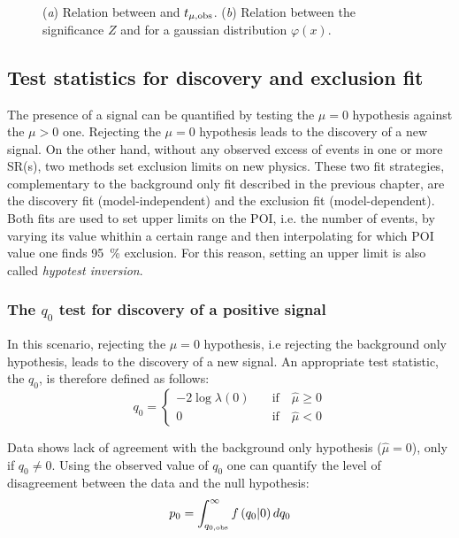 \begin{figure}[tp]
\centering
{}
\caption{(\emph{a}) Relation between \p and $t_{\mu,\textup{obs}}$. (\emph{b}) Relation between the significance $Z$ and \p for a gaussian distribution $\varphi(x)$.}
\label{pvalue}
\end{figure}

\subsection{Test statistics for discovery and exclusion fit}
The presence of a signal can be quantified by testing the $\mu=0$ hypothesis against the $\mu>0$ one. Rejecting the $\mu=0$ hypothesis leads to the discovery of a new signal. On the other hand, without any observed excess of events in one or more SR(s), two methods set exclusion limits on new physics. These two fit strategies, complementary to the background only fit described in the previous chapter, are the discovery fit (model-independent) and the exclusion fit (model-dependent). Both fits are used to set upper limits on the POI, i.e. the number of events, by varying its value whithin a certain range and then interpolating for which POI value one finds \SI{95}{\percent} exclusion. For this reason, setting an upper limit is also called \emph{hypotest inversion}.

\subsubsection{The $q_0$ test for discovery of a positive signal}
In this scenario, rejecting the $\mu = 0$ hypothesis, i.e rejecting the background only hypothesis, leads to the discovery of a new signal.  An appropriate test statistic, the $q_0$, is therefore defined as follows:
\begin{equation}
q_0=
\left\{
\begin{aligned}
-2\log{\lambda(0)}\quad &\text{if}\quad \hat{\mu}\ge0\\
 0 \qquad&\text{if}\quad \hat{\mu}<0
\end{aligned}
\right.
\end{equation} 

Data shows lack of agreement with the background only hypothesis ($\hat{\mu}=0$), only if $q_0\ne0$. Using the observed value of $q_0$ one can quantify the level of disagreement between the data and the null hypothesis:
\begin{equation}
 p_{0}=\int_{q_{0,\textup{obs}}}^\infty f\left(q_0 \vert 0\right) dq_0
 \label{eqn:pdaq0}
\end{equation}

